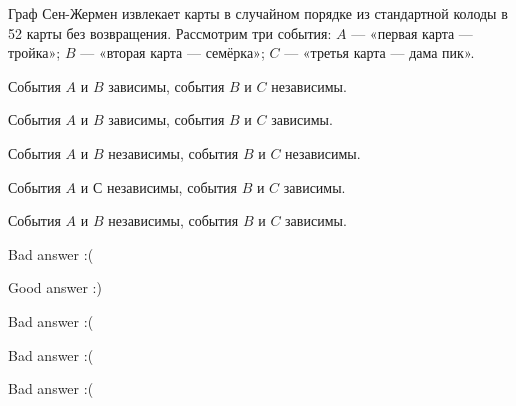 
\begin{question}
Граф Сен-Жермен извлекает карты в случайном порядке из стандартной
колоды в 52 карты без возвращения. Рассмотрим три события: \(A\) ---
«первая карта — тройка»; \(B\) — «вторая карта — семёрка»; \(C\)
--- «третья карта — дама пик».
\begin{answerlist}
  \item События \(A\) и \(B\) зависимы, события \(B\) и \(C\) независимы.
  \item События \(A\) и \(B\) зависимы, события \(B\) и \(C\) зависимы.
  \item События \(A\) и \(B\) независимы, события \(B\) и \(C\) независимы.
  \item События \(A\) и \(С\) независимы, события \(B\) и \(C\) зависимы.
  \item События \(A\) и \(B\) независимы, события \(B\) и \(C\) зависимы.
\end{answerlist}
\end{question}

\begin{solution}
\begin{answerlist}
  \item Bad answer :(
  \item Good answer :)
  \item Bad answer :(
  \item Bad answer :(
  \item Bad answer :(
\end{answerlist}
\end{solution}

